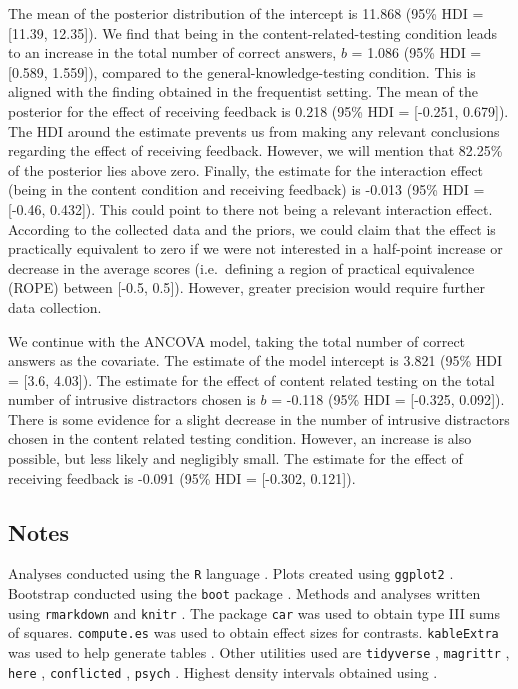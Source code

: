 \documentclass[11pt,]{article}
\begin{document}
The mean of the posterior distribution of the intercept is 11.868 (95\%
HDI = {[}11.39, 12.35{]}). We find that being in the
content-related-testing condition leads to an increase in the total
number of correct answers, \(b\) = 1.086 (95\% HDI = {[}0.589,
1.559{]}), compared to the general-knowledge-testing condition. This is
aligned with the finding obtained in the frequentist setting. The mean
of the posterior for the effect of receiving feedback is 0.218 (95\% HDI
= {[}-0.251, 0.679{]}). The HDI around the estimate prevents us from
making any relevant conclusions regarding the effect of receiving
feedback. However, we will mention that 82.25\% of the posterior lies
above zero. Finally, the estimate for the interaction effect (being in
the content condition and receiving feedback) is -0.013 (95\% HDI =
{[}-0.46, 0.432{]}). This could point to there not being a relevant
interaction effect. According to the collected data and the priors, we
could claim that the effect is practically equivalent to zero if we were
not interested in a half-point increase or decrease in the average
scores (i.e.~defining a region of practical equivalence (ROPE) between
{[}-0.5, 0.5{]}). However, greater precision would require further data
collection.

We continue with the ANCOVA model, taking the total number of correct
answers as the covariate. The estimate of the model intercept is 3.821
(95\% HDI = {[}3.6, 4.03{]}). The estimate for the effect of content
related testing on the total number of intrusive distractors chosen is
\(b\) = -0.118 (95\% HDI = {[}-0.325, 0.092{]}). There is some evidence
for a slight decrease in the number of intrusive distractors chosen in
the content related testing condition. However, an increase is also
possible, but less likely and negligibly small. The estimate for the
effect of receiving feedback is -0.091 (95\% HDI = {[}-0.302, 0.121{]}).

\hypertarget{notes}{%
\subsection{Notes}\label{notes}}

Analyses conducted using the \texttt{R} language
\citep{rcoreteamLanguageEnvironmentStatistical2019}. Plots created using
\texttt{ggplot2} \citep{wickhamGgplot2ElegantGraphics2016}. Bootstrap
conducted using the \texttt{boot} package
\citep{cantyBootBootstrapSPlus2017}. Methods and analyses written using
\texttt{rmarkdown} \citep{allaireRmarkdownDynamicDocuments2019} and
\texttt{knitr} \citep{xieKnitrGeneralPurposePackage2019}. The package
\texttt{car} \citep{foxCompanionAppliedRegression2011} was used to
obtain type III sums of squares. \texttt{compute.es}
\citep{reComputeEsCompute2013} was used to obtain effect sizes for
contrasts. \texttt{kableExtra} was used to help generate tables
\citep{zhuKableExtraConstructComplex2019}. Other utilities used are
\texttt{tidyverse} \citep{wickhamTidyverseEasilyInstall2017},
\texttt{magrittr} \citep{bacheMagrittrForwardPipeOperator2014},
\texttt{here} \citep{mullerHereSimplerWay2017}, \texttt{conflicted}
\citep{wickhamConflictedAlternativeConflict2018}, \texttt{psych}
\citep{revellePsychProceduresPsychological2018}. Highest density
intervals obtained using \citep{meredithHDIntervalHighestPosterior2018}.
\end{document}
